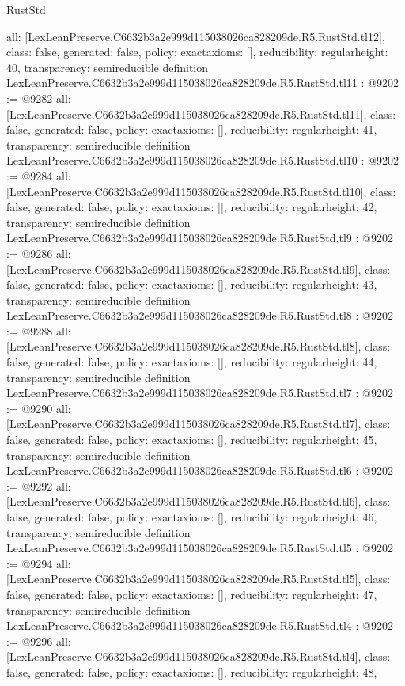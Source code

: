 \begin{lexlean}{RustStd}
\begin{coremodule}
{  all: [LexLeanPreserve.C6632b3a2e999d115038026ca828209de.R5.RustStd.tl12],
  class: false,
  generated: false,
  policy: exact{axioms: []},
  reducibility: regular{height: 40},
  transparency: semireducible
}
definition LexLeanPreserve.C6632b3a2e999d115038026ca828209de.R5.RustStd.tl11 : @9202 := @9282 {
  all: [LexLeanPreserve.C6632b3a2e999d115038026ca828209de.R5.RustStd.tl11],
  class: false,
  generated: false,
  policy: exact{axioms: []},
  reducibility: regular{height: 41},
  transparency: semireducible
}
definition LexLeanPreserve.C6632b3a2e999d115038026ca828209de.R5.RustStd.tl10 : @9202 := @9284 {
  all: [LexLeanPreserve.C6632b3a2e999d115038026ca828209de.R5.RustStd.tl10],
  class: false,
  generated: false,
  policy: exact{axioms: []},
  reducibility: regular{height: 42},
  transparency: semireducible
}
definition LexLeanPreserve.C6632b3a2e999d115038026ca828209de.R5.RustStd.tl9 : @9202 := @9286 {
  all: [LexLeanPreserve.C6632b3a2e999d115038026ca828209de.R5.RustStd.tl9],
  class: false,
  generated: false,
  policy: exact{axioms: []},
  reducibility: regular{height: 43},
  transparency: semireducible
}
definition LexLeanPreserve.C6632b3a2e999d115038026ca828209de.R5.RustStd.tl8 : @9202 := @9288 {
  all: [LexLeanPreserve.C6632b3a2e999d115038026ca828209de.R5.RustStd.tl8],
  class: false,
  generated: false,
  policy: exact{axioms: []},
  reducibility: regular{height: 44},
  transparency: semireducible
}
definition LexLeanPreserve.C6632b3a2e999d115038026ca828209de.R5.RustStd.tl7 : @9202 := @9290 {
  all: [LexLeanPreserve.C6632b3a2e999d115038026ca828209de.R5.RustStd.tl7],
  class: false,
  generated: false,
  policy: exact{axioms: []},
  reducibility: regular{height: 45},
  transparency: semireducible
}
definition LexLeanPreserve.C6632b3a2e999d115038026ca828209de.R5.RustStd.tl6 : @9202 := @9292 {
  all: [LexLeanPreserve.C6632b3a2e999d115038026ca828209de.R5.RustStd.tl6],
  class: false,
  generated: false,
  policy: exact{axioms: []},
  reducibility: regular{height: 46},
  transparency: semireducible
}
definition LexLeanPreserve.C6632b3a2e999d115038026ca828209de.R5.RustStd.tl5 : @9202 := @9294 {
  all: [LexLeanPreserve.C6632b3a2e999d115038026ca828209de.R5.RustStd.tl5],
  class: false,
  generated: false,
  policy: exact{axioms: []},
  reducibility: regular{height: 47},
  transparency: semireducible
}
definition LexLeanPreserve.C6632b3a2e999d115038026ca828209de.R5.RustStd.tl4 : @9202 := @9296 {
  all: [LexLeanPreserve.C6632b3a2e999d115038026ca828209de.R5.RustStd.tl4],
  class: false,
  generated: false,
  policy: exact{axioms: []},
  reducibility: regular{height: 48},
}
\end{coremodule}
\end{lexlean}
